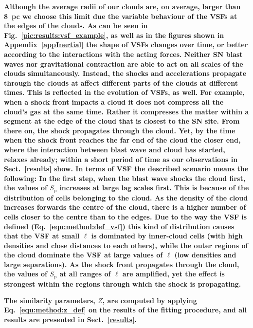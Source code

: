 \textbf{
    Although the average radii of our clouds are, on average, larger than 8~pc we choose this limit due the variable behaviour of the VSFs at the edges of the clouds. 
    As can be seen in Fig.~\ref{pic:results:vsf_example}, as well as in the figures shown in Appendix~\ref{appInertial} the shape of VSFs changes over time, or better according to the interactions with the acting forces.
    Neither SN blast waves nor gravitational contraction are able to act on all scales of the clouds simultaneously. 
    Instead, the shocks and accelerations propagate through the clouds at affect different parts of the clouds at different times.
    This is reflected in the evolution of VSFs, as well.
    For example, when a shock front impacts a cloud it does not compress all the cloud's gas at the same time.
    Rather it compresses the matter within a segment at the edge of the cloud that is closest to the SN site.
    From there on, the shock propagates through the cloud.
    Yet, by the time when the shock front reaches the far end of the cloud the closer end, where the interaction between blast wave and cloud has started, relaxes already; within a short period of time as our observations in Sect.~\ref{results} show.
    In terms of VSF the described scenario means the following:
    In the first step, when the blast wave shocks the cloud first, the values of $S_\mathrm{p}$ increases at large lag scales first.
    This is because of the distribution of cells belonging to the cloud. 
    As the density of the cloud increases forwards the centre of the cloud, there is a higher number of cells closer to the centre than to the edges. 
    Due to the way the VSF is defined (Eq.~\ref{equ:method:def_vsf}) this kind of distribution causes that the VSF at small $\ell$ is dominated by inner-cloud cells (with high densities and close distances to each others), while the outer regions of the cloud dominate the VSF at large values of $\ell$ (low densities and large separations).
    As the shock front propagates through the cloud, the values of $S_\mathrm{p}$ at all ranges of $\ell$ are amplified, yet the effect is strongest within the regions through which the shock is propagating.
}

\textbf{
    The similarity parameters, $Z$, are computed by applying Eq.~\ref{equ:method:z_def} on the results of the fitting procedure, and all results are presented in Sect.~\ref{results}.
}

